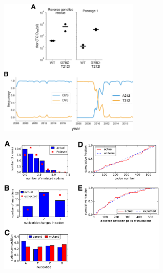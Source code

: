 \documentclass[9pt,twocolumn,twoside]{pnas-new}
\begin{document}
\begin{suppfigure}
\centerline{\includegraphics[width=0.5\textwidth]{figs/S01_G78D-T212I/G78D-T212I.pdf}}
\caption{\label{suppfig:Perth2009_mut}
{\bf Characterization of the G78D-T212I Perth/2009 HA variant.} 
(A) 
The G78D-T212I Perth/2009 HA variant supports better viral growth than the wildtype Perth/2009 HA.
Viruses were generated in duplicate by reverse genetics with the Perth/2009 NA and WSN internal genes, and passaged once at MOI = 0.01 in MDCK-SIAT1-TMPRSS2 cells.
The rescue and passage viral supernatants were collected at 72 hours post-transfection and 44 hours post-infection, respectively, and titered in MDCK-SIAT1-TMPRSS2 cells. 
The points mark each duplicate and the bar marks the mean.
(B)
The D78 variant remained at a low frequency in natural human H3N2 sequences over the past $~\sim$10 years.
The A212 variant rose to fixation in $~\sim$2011, replacing the T212 variant.
}
\end{suppfigure}

\begin{suppfigure}
\centerline{\includegraphics[width=0.6\textwidth]{figs/S02_SangerSeq/SangerSeq.pdf}}
\caption{\label{suppfig:SangerSeq}
{\bf Sanger sequencing of 31 clones from the mutant plasmid libraries.} 
(A) There were an average of $\sim$1.4 codon mutations per clone across the three plasmid mutant libraries.
(B) A mixture of one-, two-, and three-nucleotide mutations were present, with slightly fewer triple-nucleotide changes than expected.
(C) Nucleotide frequencies were uniform in the codon mutations.
(D) The mutations were distributed relatively evenly across the length of the HA coding sequence.
(E) We calculated the pairwise distances between mutations for clones carrying more than one mutation.
The cumulative distribution of the distances is shown in the red line.  
}
\end{suppfigure}
\end{document}
